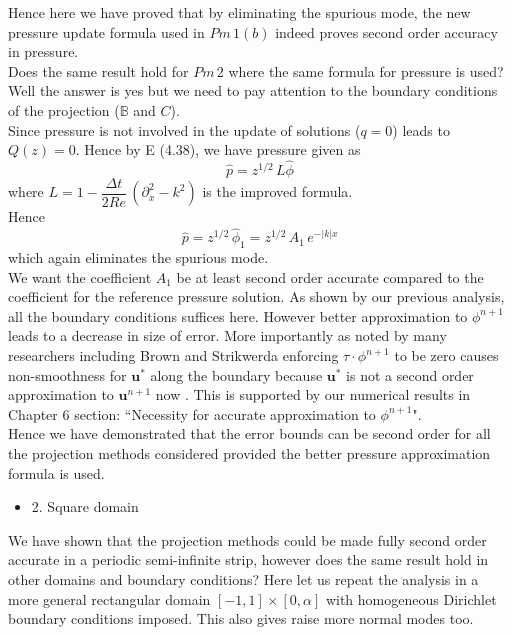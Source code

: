 Hence here we have proved that by eliminating the spurious mode, the new pressure update formula used in $Pm\,1(b)$ indeed proves second order accuracy in pressure.\\

Does the same result hold for $Pm\,2$ where the same formula for pressure is used? Well the answer is yes but we need to pay attention to the boundary conditions of the projection ($\mathbb{B}$ and $C$).\\

Since pressure is not involved in the update of solutions ($q = 0$) leads to $Q(z) = 0$. Hence by E (4.38), we have pressure given as
\begin{equation}
\hat{p} = z^{1/2}\,L\hat{\phi}
\end{equation}
where $L = 1 - \dfrac{\Delta t}{2Re}\,(\partial_x^2 - k^2)$ is the improved formula. \\
Hence
\begin{equation}
\hat{p} = z^{1/2}\,\hat{\phi}_1 = z^{1/2}\,A_1\,e^{-|k|x}
\end{equation}
which again eliminates the spurious mode.\\

We want the coefficient $A_1$ be at least second order accurate compared to the coefficient for the reference pressure solution. As shown by our previous analysis, all the boundary conditions suffices here. However better approximation to $\phi^{n+1}$ leads to a decrease in size of error. More importantly as noted by many researchers including Brown and Strikwerda enforcing $\textbf{$\tau$}\cdot\phi^{n+1}$ to be zero causes non-smoothness for $\textbf{u}^*$ along the boundary because $\textbf{u}^*$ is not a second order approximation to $\textbf{u}^{n+1}$ now \cite{strikwerda1999accuracy}. This is supported by our numerical results in Chapter 6 section: ``Necessity for accurate approximation to $\phi^{n+1}$".\\

Hence we have demonstrated that the error bounds can be second order for all the projection methods considered provided the better pressure approximation formula is used.\\

\begin{itemize}
\item 2. Square domain
\end{itemize}
We have shown that the projection methods could be made fully second order accurate in a periodic semi-infinite strip, however does the same result hold in other domains and boundary conditions? Here let us repeat the analysis in a more general rectangular domain $[-1,1] \times [0,\alpha]$ with homogeneous Dirichlet boundary conditions imposed. This also gives raise more normal modes too.\\

